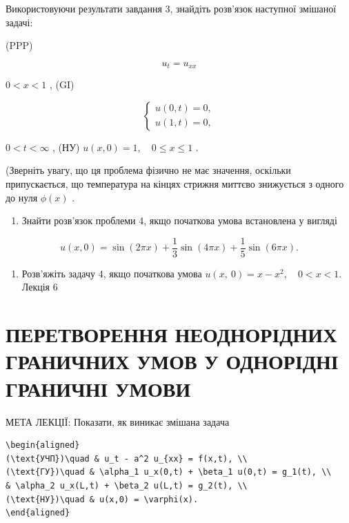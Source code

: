 \documentclass[
  ukrainian,
]{article}
\providecommand{\tightlist}{%
  \setlength{\itemsep}{0pt}\setlength{\parskip}{0pt}}
\begin{document}
Використовуючи результати завдання 3, знайдіть розв'язок наступної
змішаної задачі:

(PPP)

\[
u_t = u_{xx}
\]

\(0 < x < 1\) , (GI)

\[
\begin{cases} u(0, t) = 0, \\ u(1, t) = 0, \end{cases}
\]

\(0 < t < \infty\) , (НУ) \(u(x, 0) = 1, \quad 0 \le x \le 1\) .

(Зверніть увагу, що ця проблема фізично не має значення, оскільки
припускається, що температура на кінцях стрижня миттєво знижується з
одного до нуля \(\phi(x)\) .

\begin{enumerate}
\def\labelenumi{\arabic{enumi}.}
\setcounter{enumi}{4}
\tightlist
\item
  Знайти розв'язок проблеми 4, якщо початкова умова встановлена у
  вигляді
\end{enumerate}

\[
u(x, 0) = \sin(2\pi x) + \frac{1}{3}\sin(4\pi x) + \frac{1}{5}\sin(6\pi x).
\]

\begin{enumerate}
\def\labelenumi{\arabic{enumi}.}
\setcounter{enumi}{5}
\tightlist
\item
  Розв'яжіть задачу 4, якщо початкова умова
  \(u\left( x,\ 0\right) =x-x^{2},\quad 0< x<1.\) Лекція 6
\end{enumerate}

\section{ПЕРЕТВОРЕННЯ НЕОДНОРІДНИХ ГРАНИЧНИХ УМОВ У ОДНОРІДНІ ГРАНИЧНІ
УМОВИ}\label{ux43fux435ux440ux435ux442ux432ux43eux440ux435ux43dux43dux44f-ux43dux435ux43eux434ux43dux43eux440ux456ux434ux43dux438ux445-ux433ux440ux430ux43dux438ux447ux43dux438ux445-ux443ux43cux43eux432-ux443-ux43eux434ux43dux43eux440ux456ux434ux43dux456-ux433ux440ux430ux43dux438ux447ux43dux456-ux443ux43cux43eux432ux438}

МЕТА ЛЕКЦІЇ: Показати, як виникає змішана задача

\begin{verbatim}
\begin{aligned}
(\text{УЧП})\quad & u_t - a^2 u_{xx} = f(x,t), \\
(\text{ГУ})\quad & \alpha_1 u_x(0,t) + \beta_1 u(0,t) = g_1(t), \\
& \alpha_2 u_x(L,t) + \beta_2 u(L,t) = g_2(t), \\
(\text{НУ})\quad & u(x,0) = \varphi(x).
\end{aligned}
\end{verbatim}
\end{document}

